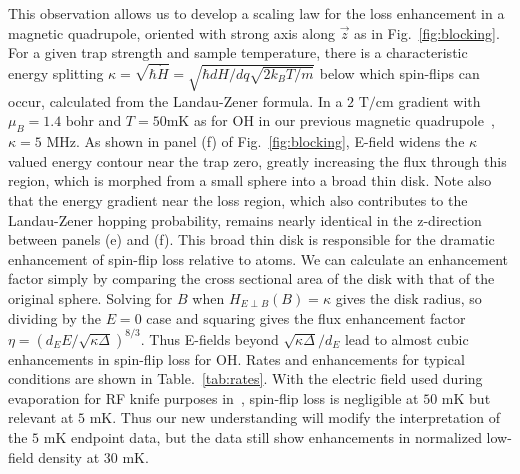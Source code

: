 \documentclass[%
 reprint,
groupedaddress,
 amsmath,amssymb,
 aps,
prl,
]{revtex4-1}
\newcommand{\epbm}{{E\!\perp\!B}}
\begin{document}
This observation allows us to develop a scaling law for the loss enhancement in a magnetic quadrupole, oriented with strong axis along $\vec{z}$ as in Fig.~\ref{fig:blocking}. For a given trap strength and sample temperature, there is a characteristic energy splitting $\kappa=\sqrt{\hbar\dot{H}}=\sqrt{\hbar dH/dq\sqrt{2k_BT/m}}$ below which spin-flips can occur, calculated from the Landau-Zener formula. In a $2\text{ T/cm}$ gradient with $\mu_B=\text{1.4 bohr}$ and $T=50 \text{mK}$ as for OH in our previous magnetic quadrupole~\cite{Sawyer2008}, $\kappa=5\text{ MHz}$. As shown in panel (f) of Fig.~\ref{fig:blocking}, E-field widens the $\kappa$ valued energy contour near the trap zero, greatly increasing the flux through this region, which is morphed from a small sphere into a broad thin disk. Note also that the energy gradient near the loss region, which also contributes to the Landau-Zener hopping probability, remains nearly identical in the z-direction between panels (e) and (f). This broad thin disk is responsible for the dramatic enhancement of spin-flip loss relative to atoms. We can calculate an enhancement factor simply by comparing the cross sectional area of the disk with that of the original sphere. Solving for $B$ when $H_\epbm(B)=\kappa$ gives the disk radius, so dividing by the $E=0$ case and squaring gives the flux enhancement factor $\eta = (d_EE/\sqrt{\kappa\Delta})^{8/3}$. Thus E-fields beyond $\sqrt{\kappa\Delta}/d_E$ lead to almost cubic enhancements in spin-flip loss for OH. Rates and enhancements for typical conditions are shown in Table.~\ref{tab:rates}. With the electric field used during evaporation for RF knife purposes in~\cite{Stuhl2012evap}, spin-flip loss is negligible at $50\text{ mK}$ but relevant at $5\text{ mK}$. Thus our new understanding will modify the interpretation of the $5\text{ mK}$ endpoint data, but the data still show enhancements in normalized low-field density at $30\text{ mK}$.


\end{document}
